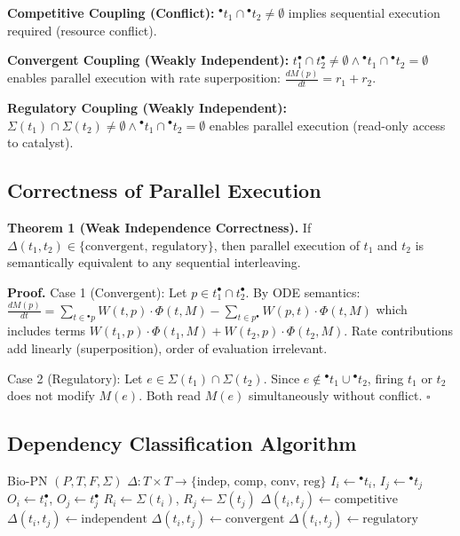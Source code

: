 \documentclass[twocolumn,11pt]{article}
\newcommand{\preset}[1]{\ensuremath{{}^{\bullet}#1}}
\newcommand{\postset}[1]{\ensuremath{#1^{\bullet}}}
\newcommand{\RegSet}[1]{\ensuremath{\Sigma(#1)}}
\newcommand{\DepType}[2]{\ensuremath{\Delta(#1,#2)}}
\begin{document}
\textbf{Competitive Coupling (Conflict):} $\preset{t_1} \cap \preset{t_2} \neq \emptyset$ implies sequential execution required (resource conflict).

\textbf{Convergent Coupling (Weakly Independent):} $\postset{t_1} \cap \postset{t_2} \neq \emptyset \land \preset{t_1} \cap \preset{t_2} = \emptyset$ enables parallel execution with rate superposition: $\frac{dM(p)}{dt} = r_1 + r_2$.

\textbf{Regulatory Coupling (Weakly Independent):} $\RegSet{t_1} \cap \RegSet{t_2} \neq \emptyset \land \preset{t_1} \cap \preset{t_2} = \emptyset$ enables parallel execution (read-only access to catalyst).

\subsection{Correctness of Parallel Execution}

\textbf{Theorem 1 (Weak Independence Correctness).} If $\DepType{t_1}{t_2} \in \{\text{convergent, regulatory}\}$, then parallel execution of $t_1$ and $t_2$ is semantically equivalent to any sequential interleaving.

\textbf{Proof.} Case 1 (Convergent): Let $p \in \postset{t_1} \cap \postset{t_2}$. By ODE semantics: $\frac{dM(p)}{dt} = \sum_{t \in \preset{p}} W(t,p) \cdot \Phi(t, M) - \sum_{t \in \postset{p}} W(p,t) \cdot \Phi(t, M)$ which includes terms $W(t_1,p) \cdot \Phi(t_1, M) + W(t_2,p) \cdot \Phi(t_2, M)$. Rate contributions add linearly (superposition), order of evaluation irrelevant.

Case 2 (Regulatory): Let $e \in \RegSet{t_1} \cap \RegSet{t_2}$. Since $e \notin \preset{t_1} \cup \preset{t_2}$, firing $t_1$ or $t_2$ does not modify $M(e)$. Both read $M(e)$ simultaneously without conflict. $\square$

\subsection{Dependency Classification Algorithm}

\begin{algorithm}[H]
\caption{Transition Dependency Classification}
\small
\begin{algorithmic}[1]
\REQUIRE Bio-PN $(P, T, F, \Sigma)$
\ENSURE $\Delta: T \times T \rightarrow \{\text{indep, comp, conv, reg}\}$
    \STATE $I_i \gets \preset{t_i}$, $I_j \gets \preset{t_j}$
    \STATE $O_i \gets \postset{t_i}$, $O_j \gets \postset{t_j}$
    \STATE $R_i \gets \RegSet{t_i}$, $R_j \gets \RegSet{t_j}$
        \STATE $\Delta(t_i, t_j) \gets \text{competitive}$
        \STATE $\Delta(t_i, t_j) \gets \text{independent}$
        \STATE $\Delta(t_i, t_j) \gets \text{convergent}$
        \STATE $\Delta(t_i, t_j) \gets \text{regulatory}$
    \ENDIF
\ENDFOR
\end{algorithmic}
\end{algorithm}
\end{document}
